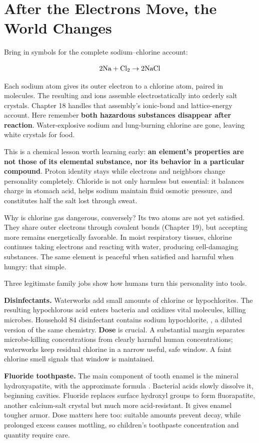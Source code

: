 \section{After the Electrons Move, the World Changes}

Bring in symbols for the complete sodium--chlorine account:

\[\mathrm{2Na} + \mathrm{Cl_2} \rightarrow \mathrm{2NaCl}\]

Each sodium atom gives its outer electron to a chlorine atom, paired in  molecules. The resulting  and  ions assemble electrostatically into orderly salt crystals. Chapter 18 handles that assembly's ionic-bond and lattice-energy account. Here remember \textbf{both hazardous substances disappear after reaction}. Water-explosive sodium and lung-burning chlorine are gone, leaving white crystals for food.

This is a chemical lesson worth learning early: \textbf{an element's properties are not those of its elemental substance, nor its behavior in a particular compound}. Proton identity stays while electrons and neighbors change personality completely. Chloride is not only harmless but essential: it balances charge in stomach acid, helps sodium maintain fluid osmotic pressure, and constitutes half the salt lost through sweat.

Why is chlorine gas dangerous, conversely? Its two atoms are not yet satisfied. They share outer electrons through covalent bonds (Chapter 19), but accepting more remains energetically favorable. In moist respiratory tissues, chlorine continues taking electrons and reacting with water, producing cell-damaging substances. The same element is peaceful when satisfied and harmful when hungry: that simple.

Three legitimate family jobs show how humans turn this personality into tools.

\textbf{Disinfectants.} Waterworks add small amounts of chlorine or hypochlorites. The resulting hypochlorous acid enters bacteria and oxidizes vital molecules, killing microbes. Household 84 disinfectant contains sodium hypochlorite, , a diluted version of the same chemistry. \textbf{Dose} is crucial. A substantial margin separates microbe-killing concentrations from clearly harmful human concentrations; waterworks keep residual chlorine in a narrow useful, safe window. A faint chlorine smell signals that window is maintained.

\textbf{Fluoride toothpaste.} The main component of tooth enamel is the mineral hydroxyapatite, with the approximate formula . Bacterial acids slowly dissolve it, beginning cavities. Fluoride replaces surface hydroxyl groups to form fluorapatite, another calcium-salt crystal but much more acid-resistant. It gives enamel tougher armor. Dose matters here too: suitable amounts prevent decay, while prolonged excess causes mottling, so children's toothpaste concentration and quantity require care.

